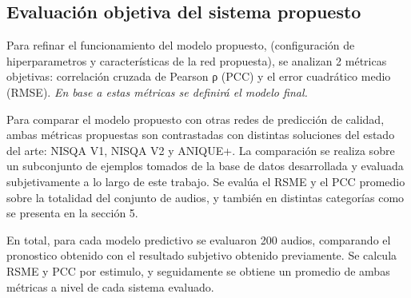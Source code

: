 \subsection{Evaluación objetiva del sistema propuesto}

Para refinar el funcionamiento del modelo propuesto, (configuración de hiperparametros y características de la red propuesta), se analizan 2 métricas objetivas: correlación cruzada de Pearson ρ (PCC) y el error cuadrático medio (RMSE). {\color{red} \textit{En base a estas métricas se definirá el modelo final.}} \color{black} 

Para comparar el modelo propuesto con otras redes de predicción de calidad, ambas métricas propuestas son contrastadas con distintas soluciones del estado del arte: NISQA V1, NISQA V2 y ANIQUE+. La comparación se realiza sobre un subconjunto de ejemplos tomados de la base de datos desarrollada y evaluada subjetivamente a lo largo de este trabajo. Se evalúa el RSME y el PCC promedio sobre la totalidad del conjunto de audios, y también en distintas categorías como se presenta en la sección 5. 

En total, para cada modelo predictivo se evaluaron 200 audios, comparando el pronostico obtenido con el resultado subjetivo obtenido previamente. Se calcula RSME y PCC por estimulo, y seguidamente se obtiene un promedio de ambas métricas a nivel de cada sistema evaluado.


\newpage